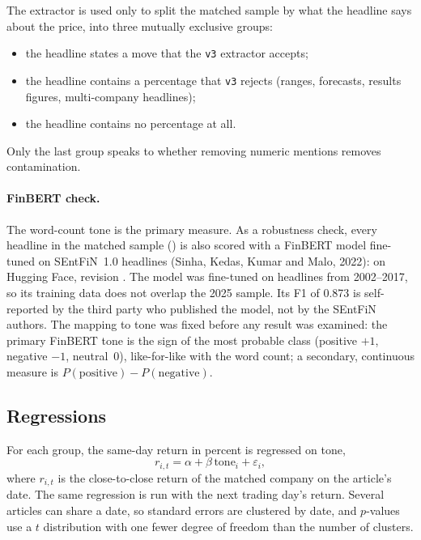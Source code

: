 \documentclass[11pt]{article}
\begin{document}
The extractor is used only to split the matched sample by what the headline says about the price, into three mutually exclusive groups:
\begin{itemize}
  \item the headline states a move that the \texttt{v3} extractor accepts;
  \item the headline contains a percentage that \texttt{v3} rejects (ranges, forecasts, results figures, multi-company headlines);
  \item the headline contains no percentage at all.
\end{itemize}
Only the last group speaks to whether removing numeric mentions removes contamination.

\paragraph{FinBERT check.} The word-count tone is the primary measure. As a robustness check, every headline in the matched sample (\fbNScored{}) is also scored with a FinBERT model fine-tuned on SEntFiN~1.0 headlines (Sinha, Kedas, Kumar and Malo, 2022): \texttt{\fbModel{}} on Hugging Face, revision \texttt{\fbRev{}}. The model was fine-tuned on headlines from 2002--2017, so its training data does not overlap the 2025 sample. Its F1 of 0.873 is self-reported by the third party who published the model, not by the SEntFiN authors. The mapping to tone was fixed before any result was examined: the primary FinBERT tone is the sign of the most probable class (positive $+1$, negative $-1$, neutral~0), like-for-like with the word count; a secondary, continuous measure is $P(\text{positive}) - P(\text{negative})$.

\subsection{Regressions}

For each group, the same-day return in percent is regressed on tone,
\begin{equation}
  r_{i,t} = \alpha + \beta\,\mathrm{tone}_{i} + \varepsilon_{i},
\end{equation}
where $r_{i,t}$ is the close-to-close return of the matched company on the article's date. The same regression is run with the next trading day's return. Several articles can share a date, so standard errors are clustered by date, and $p$-values use a $t$ distribution with one fewer degree of freedom than the number of clusters.
\end{document}
